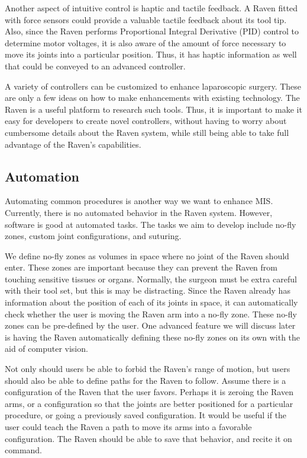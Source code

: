 \documentclass[letterpaper,twocolumn,10pt]{article}
\begin{document}
Another aspect of intuitive control is haptic and tactile feedback. A
Raven fitted with force sensors could provide a valuable tactile
feedback about its tool tip. Also, since the Raven performs
Proportional Integral Derivative (PID) control to determine motor
voltages, it is also aware of the amount of force necessary to move
its joints into a particular position. Thus, it has haptic information
as well that could be conveyed to an advanced controller.

A variety of controllers can be customized to enhance laparoscopic
surgery. These are only a few ideas on how to make enhancements with
existing technology. The Raven is a useful platform to research such
tools. Thus, it is important to make it easy for developers to create
novel controllers, without having to worry about cumbersome details
about the Raven system, while still being able to take full advantage
of the Raven's capabilities.

\subsection{Automation}
Automating common procedures is another way we want to enhance MIS.
Currently, there is no automated behavior in the Raven system. However, 
software is good at automated tasks. The tasks we aim to  
develop include no-fly zones, custom joint configurations, and 
suturing.

We define no-fly zones as volumes in space where no joint of the Raven 
should enter. These zones are important because they can prevent the 
Raven from touching sensitive tissues or organs. Normally, the surgeon 
must be extra careful with their tool set, but this is may be 
distracting. Since the Raven already has information about 
the position of each of its joints in space, it can automatically 
check whether the user is moving the Raven arm into a no-fly zone. 
These no-fly zones can be pre-defined by the user. One advanced 
feature we will discuss later is having the Raven automatically defining 
these no-fly zones on its own with the aid of computer vision.

Not only should users be able to forbid the Raven's range of motion, 
but users should also be able to define 
paths for the Raven to follow. Assume there is a configuration of 
the Raven that the user favors. Perhaps it is zeroing the Raven arms, 
or a configuration so that the joints are better positioned for a 
particular procedure, or going a previously saved configuration. 
It would be useful if the user could teach the Raven a path to move 
its arms into a favorable configuration. The Raven should be able to 
save that behavior, and recite it on command.
\end{document}
